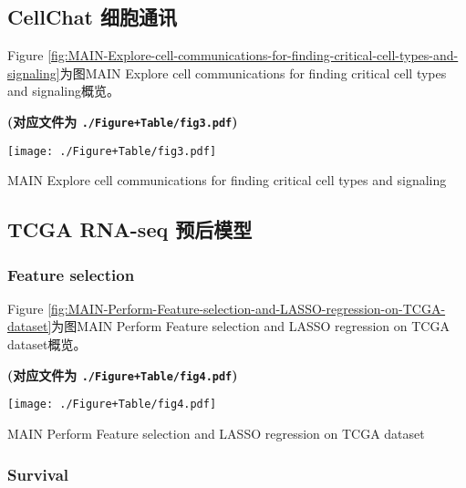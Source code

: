 \documentclass[
]{article}
\begin{document}
\hypertarget{cellchat-ux7ec6ux80deux901aux8baf}{%
\subsection{CellChat 细胞通讯}\label{cellchat-ux7ec6ux80deux901aux8baf}}

Figure \ref{fig:MAIN-Explore-cell-communications-for-finding-critical-cell-types-and-signaling}为图MAIN Explore cell communications for finding critical cell types and signaling概览。

\textbf{(对应文件为 \texttt{./Figure+Table/fig3.pdf})}

\def\@captype{figure}
\begin{center}
\texttt{[image: ./Figure+Table/fig3.pdf]}
\caption{MAIN Explore cell communications for finding critical cell types and signaling}\label{fig:MAIN-Explore-cell-communications-for-finding-critical-cell-types-and-signaling}
\end{center}

\hypertarget{tcga-rna-seq-ux9884ux540eux6a21ux578b}{%
\subsection{TCGA RNA-seq 预后模型}\label{tcga-rna-seq-ux9884ux540eux6a21ux578b}}

\hypertarget{feature-selection}{%
\subsubsection{Feature selection}\label{feature-selection}}

Figure \ref{fig:MAIN-Perform-Feature-selection-and-LASSO-regression-on-TCGA-dataset}为图MAIN Perform Feature selection and LASSO regression on TCGA dataset概览。

\textbf{(对应文件为 \texttt{./Figure+Table/fig4.pdf})}

\def\@captype{figure}
\begin{center}
\texttt{[image: ./Figure+Table/fig4.pdf]}
\caption{MAIN Perform Feature selection and LASSO regression on TCGA dataset}\label{fig:MAIN-Perform-Feature-selection-and-LASSO-regression-on-TCGA-dataset}
\end{center}

\hypertarget{survival}{%
\subsubsection{Survival}\label{survival}}
\end{document}

